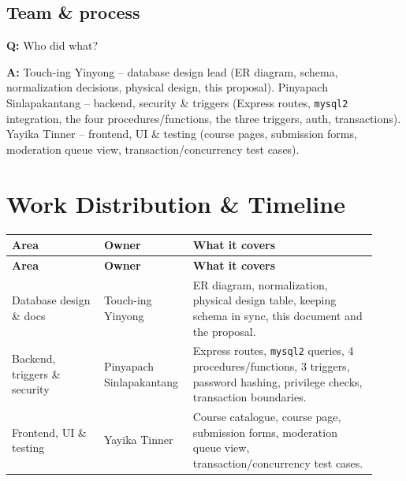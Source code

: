 \documentclass[11pt]{article}
\newcommand{\qitem}[2]{%
  \par\medskip\noindent\textbf{\color{accentc}Q:} #1\par
  \noindent\textbf{A:} #2\par
}
\begin{document}
\subsection{Team \& process}

\qitem{Who did what?}{Touch-ing Yinyong -- database design lead (ER diagram, schema, normalization decisions, physical design, this proposal). Pinyapach Sinlapakantang -- backend, security \& triggers (Express routes, \texttt{mysql2} integration, the four procedures/functions, the three triggers, auth, transactions). Yayika Tinner -- frontend, UI \& testing (course pages, submission forms, moderation queue view, transaction/concurrency test cases).}

\section{Work Distribution \& Timeline}

\begin{longtable}{@{}p{0.24\linewidth} p{0.20\linewidth} p{0.48\linewidth}@{}}
\toprule
\textbf{Area} & \textbf{Owner} & \textbf{What it covers} \\
\midrule
\endfirsthead
\toprule
\textbf{Area} & \textbf{Owner} & \textbf{What it covers} \\
\midrule
\endhead
\bottomrule
\endfoot
Database design \& docs & Touch-ing Yinyong & ER diagram, normalization, physical design table, keeping schema in sync, this document and the proposal. \\[4pt]
Backend, triggers \& security & Pinyapach Sinlapakantang & Express routes, \texttt{mysql2} queries, 4 procedures/functions, 3 triggers, password hashing, privilege checks, transaction boundaries. \\[4pt]
Frontend, UI \& testing & Yayika Tinner & Course catalogue, course page, submission forms, moderation queue view, transaction/concurrency test cases. \\
\end{longtable}
\end{document}

